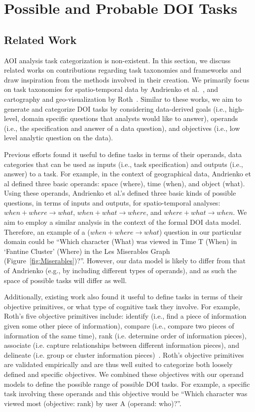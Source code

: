 \section{Possible and Probable DOI Tasks}
\label{sec:DOIAnalysisTasks}

\subsection{Related Work}
AOI analysis task categorization is non-existent. In this section, we discuss related works on contributions regarding task taxonomies and frameworks and draw inspiration from the methods involved in their creation. We primarily focus on task taxonomies for spatio-temporal data by Andrienko et al.~\cite{And03}, and cartography and geo-visualization by Roth~\cite{Roth13}. Similar to these works, we aim to generate and categorize DOI tasks by considering data-derived goals (i.e., high-level, domain specific questions that analysts would like to answer), operands (i.e., the specification and answer of a data question), and objectives (i.e., low level analytic question on the data). 

Previous efforts found it useful to define tasks in terms of their operands, data categories that can be used as inputs (i.e., task specification) and outputs (i.e., answer) to a task.  For example, in the context of geographical data, Andrienko et al defined three basic operands: space (where), time (when), and object (what). Using these operands, Andrienko et al.'s defined three basic kinds of possible questions, in terms of inputs and outputs, for spatio-temporal analyses: $when + where \rightarrow what$, $when + what \rightarrow where$, and $where + what \rightarrow when$. We aim to employ a similar analysis in the context of the formal DOI data model. Therefore, an example of a ($when + where \rightarrow what$) question in our particular domain could be ``Which character (What) was viewed in Time T (When) in `Fantine Cluster' (Where) in the Les Miserables Graph (Figure~\ref{fig:Miserables})?''. However, our data model is likely to differ from that of Andrienko (e.g., by including different types of operands), and as such the space of possible tasks will differ as well. 

Additionally, existing work also found it useful to define tasks in terms of their objective primitives, or what type of cognitive task they involve. For example, Roth's five objective primitives include: identify (i.e., find a piece of information given some other piece of information), compare (i.e., compare two pieces of information of the same time), rank (i.e. determine order of information pieces), associate (i.e. capture relationships between different information pieces), and delineate (i.e. group or cluster information pieces)~\cite{Roth13}.  Roth's objective primitives are validated empirically and are thus well suited to categorize both loosely defined and specific objectives. We combined these objectives with our operand models to define the possible range of possible DOI tasks. For example, a specific task involving these operands and this objective would be ``Which character was viewed most (objective: rank) by user A (operand: who)?''. 

